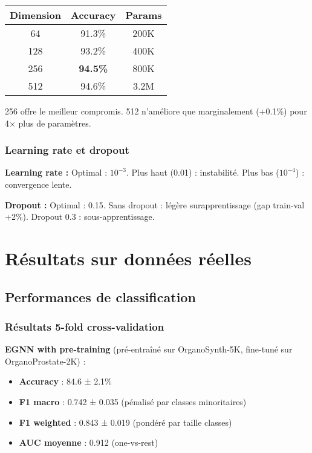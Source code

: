 \begin{center}
\begin{tabular}{|c|c|c|}
\hline
\textbf{Dimension} & \textbf{Accuracy} & \textbf{Params} \\
\hline
64 & 91.3\% & 200K \\
128 & 93.2\% & 400K \\
256 & \textbf{94.5\%} & 800K \\
512 & 94.6\% & 3.2M \\
\hline
\end{tabular}
\end{center}

256 offre le meilleur compromis. 512 n'améliore que marginalement (+0.1\%) pour 4× plus de paramètres.

\subsubsection{Learning rate et dropout}

\textbf{Learning rate :}
Optimal : $10^{-3}$. Plus haut (0.01) : instabilité. Plus bas ($10^{-4}$) : convergence lente.

\textbf{Dropout :}
Optimal : 0.15. Sans dropout : légère surapprentissage (gap train-val +2\%). Dropout 0.3 : sous-apprentissage.

\section{Résultats sur données réelles}

\subsection{Performances de classification}

\subsubsection{Résultats 5-fold cross-validation}

\textbf{EGNN with pre-training} (pré-entraîné sur OrganoSynth-5K, fine-tuné sur OrganoProstate-2K) :
\begin{itemize}
    \item \textbf{Accuracy} : 84.6 ± 2.1\%
    \item \textbf{F1 macro} : 0.742 ± 0.035 (pénalisé par classes minoritaires)
    \item \textbf{F1 weighted} : 0.843 ± 0.019 (pondéré par taille classes)
    \item \textbf{AUC moyenne} : 0.912 (one-vs-rest)
\end{itemize}

